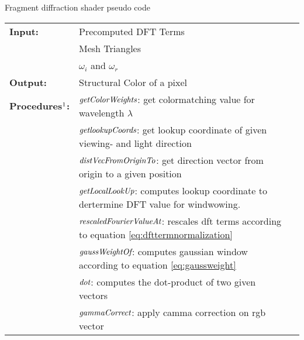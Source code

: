 \begin{algorithm}[H]
  \caption{Fragment diffraction shader pseudo code}
  \begin{table}[H]
    \begin{tabular}{@{}lll@{}}
      \textbf{Input:} & Precomputed DFT Terms  \\
      & Mesh Triangles  \\
      & $\omega_i$ and $\omega_r$  \\
      \textbf{Output:} & Structural Color of a pixel \\
      \textbf{Procedures$\footnotemark$:} & $\emph{getColorWeights}$: get colormatching value for wavelength $\lambda$ \\
      & $\emph{getlookupCoords}$: get lookup coordinate of given viewing- and light direction \\
      & $\emph{distVecFromOriginTo}$: get direction vector from origin to a given position \\
      & $\emph{getLocalLookUp}$: computes lookup coordinate to dertermine DFT value for windwowing. \\
      & $\emph{rescaledFourierValueAt}$: rescales dft terms according to equation \ref{eq:dfttermnormalization}\\
      & $\emph{gaussWeightOf}$: computes gaussian window according to equation \ref{eq:gaussweight} \\
      & $\emph{dot}$: computes the dot-product of two given vectors \\
      & $\emph{gammaCorrect}$: apply camma correction on rgb vector \\  
    \end{tabular} 
  \end{table}
  

\end{algorithm}
